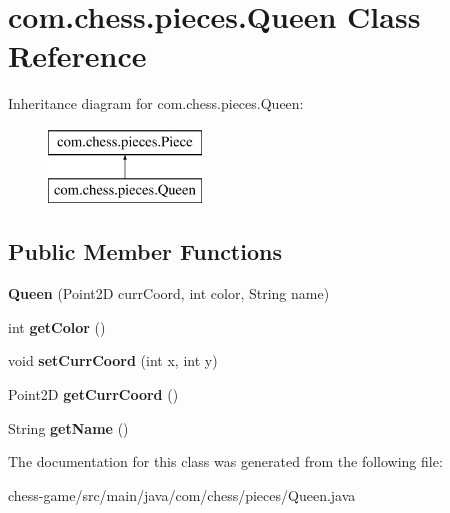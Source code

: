 \hypertarget{classcom_1_1chess_1_1pieces_1_1_queen}{}\section{com.\+chess.\+pieces.\+Queen Class Reference}
\label{classcom_1_1chess_1_1pieces_1_1_queen}
Inheritance diagram for com.\+chess.\+pieces.\+Queen\+:\begin{figure}[H]
\begin{center}
\leavevmode
\includegraphics[height=2.000000cm]{classcom_1_1chess_1_1pieces_1_1_queen}
\end{center}
\end{figure}
\subsection*{Public Member Functions}
\begin{DoxyCompactItemize}
\item 
\mbox{\label{classcom_1_1chess_1_1pieces_1_1_queen_ac3e199f2d1bffa456ff1a997d49cbe28}} 
{\bfseries Queen} (Point2D curr\+Coord, int color, String name)
\item 
\mbox{\label{classcom_1_1chess_1_1pieces_1_1_queen_a9848b431b925ccaefd6232b14901509b}} 
int {\bfseries get\+Color} ()
\item 
\mbox{\label{classcom_1_1chess_1_1pieces_1_1_queen_af3360347ab5e61890fb2d9969fcf5ffe}} 
void {\bfseries set\+Curr\+Coord} (int x, int y)
\item 
\mbox{\label{classcom_1_1chess_1_1pieces_1_1_queen_a3ed31b53f23f0d9dc8df2b283d56e0e2}} 
Point2D {\bfseries get\+Curr\+Coord} ()
\item 
\mbox{\label{classcom_1_1chess_1_1pieces_1_1_queen_ad89d41a32f3dbe5c58ff4d8c3f0d668c}} 
String {\bfseries get\+Name} ()
\end{DoxyCompactItemize}


The documentation for this class was generated from the following file\+:\begin{DoxyCompactItemize}
\item 
chess-\/game/src/main/java/com/chess/pieces/Queen.\+java\end{DoxyCompactItemize}
